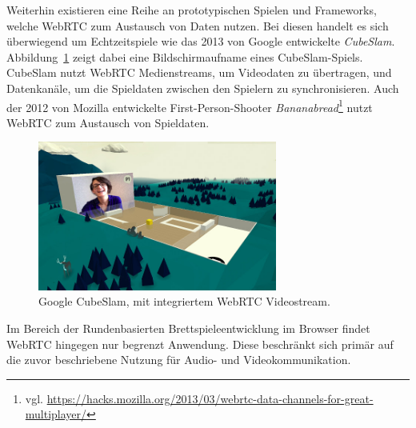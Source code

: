 Weiterhin existieren eine Reihe an prototypischen Spielen und Frameworks, welche \acs{WebRTC} zum Austausch von Daten nutzen. Bei diesen handelt es sich überwiegend um Echtzeitspiele wie das 2013 von Google entwickelte \textit{CubeSlam}. Abbildung~\ref{fig:cuubslam} zeigt dabei eine Bildschirmaufname eines CubeSlam-Spiels. CubeSlam nutzt \acs{WebRTC} Medienstreams, um Videodaten zu übertragen, und Datenkanäle, um die Spieldaten zwischen den Spielern zu synchronisieren. Auch der 2012 von Mozilla entwickelte First-Person-Shooter \textit{Bananabread}\footnote{vgl. \url{https://hacks.mozilla.org/2013/03/webrtc-data-channels-for-great-multiplayer/}} nutzt WebRTC zum Austausch von Spieldaten.\par

\begin{figure}[h]
\centering
\includegraphics[width=0.70\textwidth]{bilder/cubeslam.jpg}
\caption{Google CubeSlam, mit integriertem WebRTC Videostream.}
\label{fig:cuubslam}
\end{figure}

Im Bereich der Rundenbasierten Brettspieleentwicklung im Browser findet WebRTC hingegen nur begrenzt Anwendung. Diese beschränkt sich primär auf die zuvor beschriebene Nutzung für Audio- und Videokommunikation.\par
